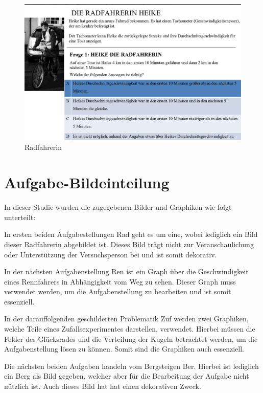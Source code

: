 \begin{figure}[H]
\noindent\hspace{0.5mm}\includegraphics[width=17cm]{./Ressourcen/Radfahrerin.png}
\caption{Radfahrerin}
\end{figure}

\section{Aufgabe-Bildeinteilung}

In dieser Studie wurden die zugegebenen Bilder und Graphiken wie folgt unterteilt:

In ersten beiden Aufgabestellungen \gls{Rad} geht es um eine, wobei lediglich ein Bild dieser Radfahrerin abgebildet ist. Dieses Bild trägt nicht zur Veranschaulichung oder Unterstützung der Versuchsperson bei und ist somit dekorativ. 


In der nächsten Aufgabenstellung \gls{Ren} ist ein Graph über die Geschwindigkeit eines  Rennfahrers in Abhängigkeit vom Weg zu sehen. Dieser Graph muss verwendet werden, um die Aufgabenstellung zu bearbeiten und ist somit essenziell. 


In der darauffolgenden geschilderten Problematik \gls{Zuf} werden zwei Graphiken, welche Teile eines Zufallsexperimentes darstellen, verwendet. Hierbei müssen die Felder des Glücksrades und die Verteilung der Kugeln betrachtet werden, um die Aufgabenstellung lösen zu können. Somit sind die Graphiken auch essenziell.


Die nächsten beiden Aufgaben handeln vom Bergsteigen \gls{Ber}. Hierbei ist lediglich ein Berg als Bild gegeben, welcher aber für die Bearbeitung der Aufgabe nicht nützlich ist. Auch dieses Bild hat hat einen dekorativen Zweck.


